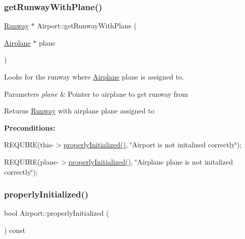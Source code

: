 \subsubsection{\texorpdfstring{get\+Runway\+With\+Plane()}{getRunwayWithPlane()}}
{\footnotesize\ttfamily \mbox{\hyperlink{class_runway}{Runway}} $\ast$ Airport\+::get\+Runway\+With\+Plane (\begin{DoxyParamCaption}\item[{\mbox{\hyperlink{class_airplane}{Airplane}} $\ast$}]{plane }\end{DoxyParamCaption})}



Looks for the runway where \mbox{\hyperlink{class_airplane}{Airplane}} plane is assigned to. 


\begin{DoxyParams}{Parameters}
{\em plane} & Pointer to airplane to get runway from \\
\hline
\end{DoxyParams}
\begin{DoxyReturn}{Returns}
\mbox{\hyperlink{class_runway}{Runway}} with airplane plane assigned to
\end{DoxyReturn}
{\bfseries Preconditions\+:}
\begin{DoxyItemize}
\item R\+E\+Q\+U\+I\+RE(this-\/$>$\mbox{\hyperlink{class_airport_aa13e68ac58e8875837fbe888325cfff6}{properly\+Initialized()}}, \char`\"{}\+Airport is not initalized correctly\char`\"{});
\item R\+E\+Q\+U\+I\+RE(plane-\/$>$\mbox{\hyperlink{class_airport_aa13e68ac58e8875837fbe888325cfff6}{properly\+Initialized()}}, \char`\"{}\+Airplane \textquotesingle{}plane\textquotesingle{} is not initalized correctly\char`\"{}); 
\end{DoxyItemize}\mbox{\label{class_airport_aa13e68ac58e8875837fbe888325cfff6}} 
\subsubsection{\texorpdfstring{properly\+Initialized()}{properlyInitialized()}}
{\footnotesize\ttfamily bool Airport\+::properly\+Initialized (\begin{DoxyParamCaption}{ }\end{DoxyParamCaption}) const}



